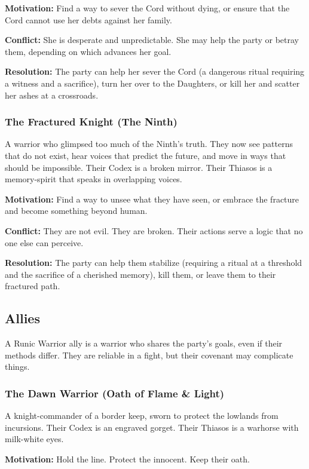 \textbf{Motivation:} Find a way to sever the Cord without dying, or ensure that the Cord cannot use her debts against her family.

\textbf{Conflict:} She is desperate and unpredictable. She may help the party or betray them, depending on which advances her goal.

\textbf{Resolution:} The party can help her sever the Cord (a dangerous ritual requiring a witness and a sacrifice), turn her over to the Daughters, or kill her and scatter her ashes at a crossroads.

\subsubsection{The Fractured Knight (The Ninth)}

A warrior who glimpsed too much of the Ninth's truth. They now see patterns that do not exist, hear voices that predict the future, and move in ways that should be impossible. Their Codex is a broken mirror. Their Thiasos is a memory-spirit that speaks in overlapping voices.

\textbf{Motivation:} Find a way to unsee what they have seen, or embrace the fracture and become something beyond human.

\textbf{Conflict:} They are not evil. They are broken. Their actions serve a logic that no one else can perceive.

\textbf{Resolution:} The party can help them stabilize (requiring a ritual at a threshold and the sacrifice of a cherished memory), kill them, or leave them to their fractured path.

\subsection{Allies}

A Runic Warrior ally is a warrior who shares the party's goals, even if their methods differ. They are reliable in a fight, but their covenant may complicate things.

\subsubsection{The Dawn Warrior (Oath of Flame \& Light)}

A knight-commander of a border keep, sworn to protect the lowlands from incursions. Their Codex is an engraved gorget. Their Thiasos is a warhorse with milk-white eyes.

\textbf{Motivation:} Hold the line. Protect the innocent. Keep their oath.

